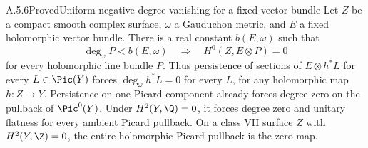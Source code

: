 \begin{statement}{A.5.6}{Proved}{Uniform negative-degree vanishing for a fixed vector bundle}
Let $Z$ be a compact smooth complex surface, $\omega$ a Gauduchon metric, and $E$ a fixed holomorphic vector bundle. There is a real constant $b(E,\omega)$ such that
\[
 \deg_\omega P<b(E,\omega)
 \quad\Longrightarrow\quad H^0(Z,E\otimes P)=0
 \tag{A.30}
\]
for every holomorphic line bundle $P$. Thus persistence of sections of $E\otimes h^*L$ for every $L\in\Pic(Y)$ forces $\deg_\omega h^*L=0$ for every $L$, for any holomorphic map $h:Z\to Y$. Persistence on one Picard component already forces degree zero on the pullback of $\Pic^0(Y)$. Under $H^2(Y,\Q)=0$, it forces degree zero and unitary flatness for every ambient Picard pullback. On a class VII surface $Z$ with $H^2(Y,\Z)=0$, the entire holomorphic Picard pullback is the zero map.
\end{statement}
